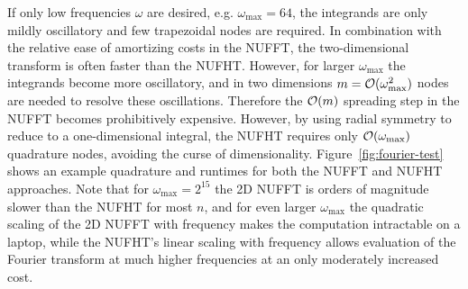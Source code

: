 If only low frequencies $\omega$ are desired, e.g. $\omega_{\text{max}} = 64$,
the integrands are only mildly oscillatory and few trapezoidal nodes are
required. In combination with the relative ease of amortizing costs in the
NUFFT, the two-dimensional transform is often faster than the NUFHT. However,
for larger $\omega_{\text{max}}$ the integrands become more oscillatory, and in
two dimensions $m = \mathcal{O}(\omega_{\text{max}}^2)$ nodes are needed to resolve
these oscillations. Therefore the $\mathcal{O}(m)$ spreading step in the NUFFT becomes
prohibitively expensive. However, by using radial symmetry to reduce to a
one-dimensional integral, the NUFHT requires only $\mathcal{O}(\omega_{\text{max}})$
quadrature nodes, avoiding the curse of dimensionality.
Figure~\ref{fig:fourier-test} shows an example quadrature and runtimes for both
the NUFFT and NUFHT approaches. Note that for $\omega_{\text{max}} = 2^{15}$ the
2D NUFFT is orders of magnitude slower than the NUFHT for most $n$, and for even
larger $\omega_{\text{max}}$ the quadratic scaling of the 2D NUFFT with
frequency makes the computation intractable on a laptop, while the NUFHT's
linear scaling with frequency allows evaluation of the Fourier transform at much
higher frequencies at an only moderately increased cost.

